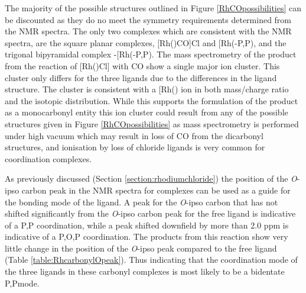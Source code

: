 The majority of the possible structures outlined in Figure \ref{RhCOpossibilities} can be discounted as they do no meet the symmetry requirements determined from the NMR spectra.  The only two complexes which are consistent with the NMR spectra, are the square planar complexes, [Rh(\tBuxantphosk)CO]Cl and [Rh(\tBuxantphos-\dento{}P,P\textprime)\ce{(CO)2]Cl}, and the trigonal bipyramidal complex \trans-[Rh(\tBuxantphos-\dento{}P,P\textprime)\ce{(CO)2Cl]}.  The mass spectrometry of the product from the reaction of [Rh(\tBuxantphos)Cl] with CO show a single major ion cluster.  This cluster only differs for the three ligands due to the differences in the ligand structure.  The cluster is consistent with a [Rh(\tBuxantphos)\ce{(CO)]+} ion in both mass/charge ratio and the isotopic distribution.  While this supports the formulation of the product as a monocarbonyl entity this ion cluster could result from any of the possible structures given in Figure \ref{RhCOpossibilities} as mass spectrometry is performed under high vacuum which may result in loss of CO from the dicarbonyl structures, and ionisation by loss of chloride ligands is very common for coordination complexes.

As previously discussed (Section \ref{section:rhodiumchloride}) the position of the \emph{O}-ipso carbon peak in the \carbon{} NMR spectra for \tBuxantphos{} complexes can be used as a guide for the bonding mode of the ligand.  A peak for the  \emph{O}-ipso carbon that has not shifted significantly from the \emph{O}-ipso carbon peak for the free ligand is indicative of a \dento{}P,P\textprime{} coordination, while a peak shifted downfield by more than 2.0 ppm is indicative of a \dento{}P,O,P\textprime{} coordination.   The products from this reaction show very little change in the position of the \emph{O}-ipso peak compared to the free ligand (Table \ref{table:RhcarbonylOpeak}).  Thus indicating that the  coordination mode of the three \tBuxantphos{} ligands in these carbonyl complexes is most likely to be a bidentate \dento{}P,P\textprime mode.

